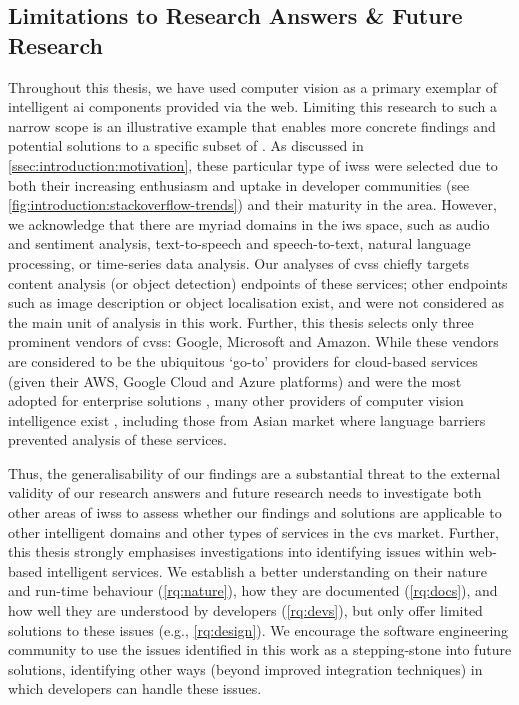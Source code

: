 \subsection{Limitations to Research Answers \& Future Research}

Throughout this thesis, we have used computer vision as a primary exemplar of intelligent \gls{ai} components provided via the web. Limiting this research to such a narrow scope is an illustrative example that enables more concrete findings and potential solutions to a specific subset of . As discussed in \cref{ssec:introduction:motivation}, these particular type of \glspl{iws} were selected due to both their increasing enthusiasm and uptake in developer communities (see \cref{fig:introduction:stackoverflow-trends}) and their maturity in the area. However, we acknowledge that there are myriad domains in the \gls{iws} space, such as audio and sentiment analysis, text-to-speech and speech-to-text, natural language processing, or time-series data analysis. Our analyses of \glspl{cvs} chiefly targets content analysis (or object detection) endpoints of these services; other endpoints such as image description or object localisation exist, and were not considered as the main unit of analysis in this work. Further, this thesis selects only three prominent vendors of \glspl{cvs}: Google, Microsoft and Amazon. While these vendors are considered to be the ubiquitous `go-to' providers for cloud-based services (given their AWS, Google Cloud and Azure platforms) and were the most adopted for enterprise solutions \citep{RightScaleInc:2018kJ}, many other providers of computer vision intelligence exist , including those from Asian market  where language barriers prevented analysis of these services.

Thus, the generalisability of our findings are a substantial threat to the external validity of our research answers and future research needs to investigate both other areas of \glspl{iws} to assess whether our findings and solutions are applicable to other intelligent domains and other types of services in the \gls{cvs} market. Further, this thesis strongly emphasises investigations into identifying issues within web-based intelligent services. We establish a better understanding on their nature and run-time behaviour  (\ref{rq:nature}), how they are documented (\ref{rq:docs}), and how well they are understood by developers (\ref{rq:devs}), but only offer limited solutions to these issues (e.g., \ref{rq:design}). We encourage the software engineering community to use the issues identified in this work as a stepping-stone into future solutions, identifying other ways (beyond improved integration techniques) in which developers can handle these issues.

